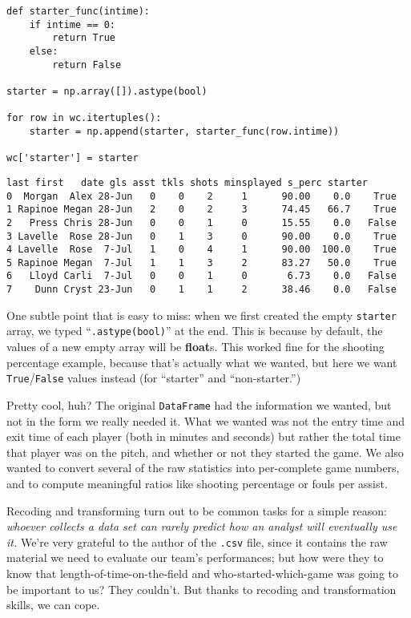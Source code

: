 \begin{Verbatim}[fontsize=\small,samepage=true,frame=single,framesep=3mm]
def starter_func(intime):
    if intime == 0:
        return True
    else:
        return False

starter = np.array([]).astype(bool)

for row in wc.itertuples():
    starter = np.append(starter, starter_func(row.intime))

wc['starter'] = starter
\end{Verbatim}
\vspace{-.2in}

\begin{Verbatim}[fontsize=\scriptsize,samepage=true,frame=leftline,framesep=5mm,framerule=1mm]
     last first   date gls asst tkls shots minsplayed s_perc starter
0  Morgan  Alex 28-Jun   0    0    2     1      90.00    0.0    True
1 Rapinoe Megan 28-Jun   2    0    2     3      74.45   66.7    True
2   Press Chris 28-Jun   0    0    1     0      15.55    0.0   False
3 Lavelle  Rose 28-Jun   0    1    3     0      90.00    0.0    True
4 Lavelle  Rose  7-Jul   1    0    4     1      90.00  100.0    True
5 Rapinoe Megan  7-Jul   1    1    3     2      83.27   50.0    True
6   Lloyd Carli  7-Jul   0    0    1     0       6.73    0.0   False
7    Dunn Cryst 23-Jun   0    1    1     2      38.46    0.0   False
\end{Verbatim}


One subtle point that is easy to miss: when we first created the empty
\texttt{starter} array, we typed ``\texttt{.astype(bool)}'' at the end. This is
because by default, the values of a new empty array will be \textbf{float}s.
This worked fine for the shooting percentage example, because that's actually
what we wanted, but here we want \texttt{True}/\texttt{False} values instead
(for ``starter'' and ``non-starter.'')

Pretty cool, huh? The original \texttt{DataFrame} had the information we
wanted, but not in the form we really needed it. What we wanted was not the
entry time and exit time of each player (both in minutes and seconds) but
rather the total time that player was on the pitch, and whether or not they
started the game. We also wanted to convert several of the raw statistics into
per-complete game numbers, and to compute meaningful ratios like shooting
percentage or fouls per assist.

\bigskip

Recoding and transforming turn out to be common tasks for a simple reason:
\textit{whoever collects a data set can rarely predict how an analyst will
eventually use it.} We're very grateful to the author of the \texttt{.csv}
file, since it contains the raw material we need to evaluate our team's
performances; but how were they to know that length-of-time-on-the-field and
who-started-which-game was going to be important to us? They couldn't. But
thanks to recoding and transformation skills, we can cope.

